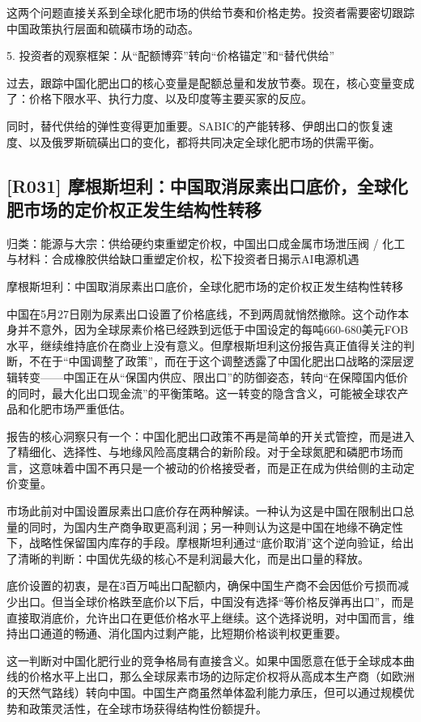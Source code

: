 \documentclass[11pt]{ctexart}
\begin{document}
这两个问题直接关系到全球化肥市场的供给节奏和价格走势。投资者需要密切跟踪中国政策执行层面和硫磺市场的动态。

5. 投资者的观察框架：从“配额博弈”转向“价格锚定”和“替代供给”

过去，跟踪中国化肥出口的核心变量是配额总量和发放节奏。现在，核心变量变成了：价格下限水平、执行力度、以及印度等主要买家的反应。

同时，替代供给的弹性变得更加重要。SABIC的产能转移、伊朗出口的恢复速度、以及俄罗斯硫磺出口的变化，都将共同决定全球化肥市场的供需平衡。

\subsection{[R031] 摩根斯坦利：中国取消尿素出口底价，全球化肥市场的定价权正发生结构性转移}
{\small\color{refgray}归类：能源与大宗：供给硬约束重塑定价权，中国出口成金属市场泄压阀 / 化工与材料：合成橡胶供给缺口重塑定价权，松下投资者日揭示AI电源机遇}

摩根斯坦利：中国取消尿素出口底价，全球化肥市场的定价权正发生结构性转移

中国在5月27日刚为尿素出口设置了价格底线，不到两周就悄然撤除。这个动作本身并不意外，因为全球尿素价格已经跌到远低于中国设定的每吨660-680美元FOB水平，继续维持底价在商业上没有意义。但摩根斯坦利这份报告真正值得关注的判断，不在于“中国调整了政策”，而在于这个调整透露了中国化肥出口战略的深层逻辑转变——中国正在从“保国内供应、限出口”的防御姿态，转向“在保障国内低价的同时，最大化出口现金流”的平衡策略。这一转变的隐含含义，可能被全球农产品和化肥市场严重低估。

报告的核心洞察只有一个：中国化肥出口政策不再是简单的开关式管控，而是进入了精细化、选择性、与地缘风险高度耦合的新阶段。对于全球氮肥和磷肥市场而言，这意味着中国不再只是一个被动的价格接受者，而是正在成为供给侧的主动定价变量。

市场此前对中国设置尿素出口底价存在两种解读。一种认为这是中国在限制出口总量的同时，为国内生产商争取更高利润；另一种则认为这是中国在地缘不确定性下，战略性保留国内库存的手段。摩根斯坦利通过“底价取消”这个逆向验证，给出了清晰的判断：中国优先级的核心不是利润最大化，而是出口量的释放。

底价设置的初衷，是在3百万吨出口配额内，确保中国生产商不会因低价亏损而减少出口。但当全球价格跌至底价以下后，中国没有选择“等价格反弹再出口”，而是直接取消底价，允许出口在更低价格水平上继续。这个选择说明，对中国而言，维持出口通道的畅通、消化国内过剩产能，比短期价格谈判权更重要。

这一判断对中国化肥行业的竞争格局有直接含义。如果中国愿意在低于全球成本曲线的价格水平上出口，那么全球尿素市场的边际定价权将从高成本生产商（如欧洲的天然气路线）转向中国。中国生产商虽然单体盈利能力承压，但可以通过规模优势和政策灵活性，在全球市场获得结构性份额提升。
\end{document}
